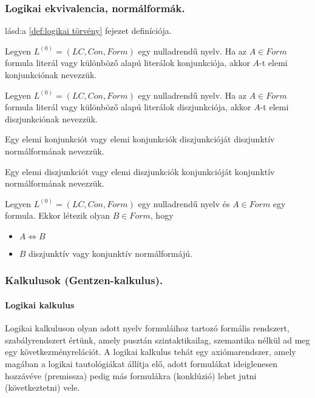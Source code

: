 \subsubsection{Logikai ekvivalencia, normálformák.}
\begin{definition}
	lásd:a \ref{def:logikai törvény} fejezet definíciója.
\end{definition}
\begin{definition}
	Legyen $L^{(0)} = (LC, Con, Form)$ egy nulladrendű nyelv. Ha az $A \in Form$ formula literál vagy különböző alapú literálok konjunkciója, akkor $A$-t elemi konjunkciónak nevezzük. 
\end{definition}
\begin{definition}
	Legyen $L^{(0)} = (LC, Con, Form)$ egy nulladrendű nyelv. Ha az $A \in Form$ formula literál vagy különböző alapú literálok diszjunkciója, akkor $A$-t elemi diszjunkciónak nevezzük. 
\end{definition}
\begin{definition}
	Egy elemi konjunkciót vagy elemi konjunkciók diszjunkcióját diszjunktív normálformának nevezzük. 
\end{definition}
\begin{definition}
	Egy elemi diszjunkciót vagy elemi diszjunkciók konjunkcióját konjunktív normálformának nevezzük.
\end{definition}
\begin{definition}
	Legyen $L^{(0)} = (LC, Con, Form)$ egy nulladrendű nyelv és $A \in Form$ egy formula. Ekkor létezik olyan $B \in Form$, hogy
	\begin{itemize}
		\item $A\Leftrightarrow B$
		\item $B$ diszjunktív vagy konjunktív normálformájú. 
	\end{itemize}

\end{definition}

\subsubsection{Kalkulusok (Gentzen-kalkulus).}

\paragraph{Logikai kalkulus} 
Logikai kalkuluson olyan adott nyelv formuláihoz tartozó formális rendszert, szabályrendszert értünk, amely pusztán szintaktikailag, szemantika nélkül ad meg egy következményrelációt. A logikai kalkulus tehát egy axiómarendszer, amely magában a logikai tautológiákat állítja elő, adott formulákat ideiglenesen hozzávéve (premissza) pedig más formulákra (konklúzió) lehet jutni (következtetni) vele.


